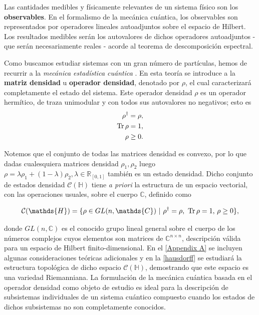 \documentclass{report} %
\numberwithin{equation}{section}
\begin{document}
Las cantidades medibles y físicamente relevantes de un sistema físico son los \textbf{observables}. En el formalismo de la mecánica cuántica, los observables son representados por operadores lineales autoadjuntos sobre el espacio de Hilbert. Los resultados medibles serán los autovalores de dichos operadores autoadjuntos - que serán necesariamente reales - acorde al teorema de descomposición espectral.

Como buscamos estudiar sistemas con un gran número de partículas, hemos de recurrir a la \textit{mecánica estadística cuántica} \cite{PATHRIA2011115,Nielsen.00,HeinzPetruccione}. 
En esta teoría se introduce a la \textbf{matriz densidad} u \textbf{operador densidad}, denotado por $\rho$, el cual caracterizará completamente el estado del sistema. Este {operador densidad} $\rho$ es un operador hermítico, de traza unimodular y con todos sus autovalores no negativos; esto es
\begin{subequations}
\begin{align}
    \rho^{\dagger} = \rho, \\
    \Tr \rho = 1, \\
    \rho \geq 0.
\end{align}
\end{subequations}

Notemos que el conjunto de todas las matrices densidad es convexo, por lo que dadas cualesquiera matrices densidad $\rho_1, \rho_2$ luego $\rho = \lambda\rho_1+ (1-\lambda)\rho_2, \lambda \in \mathds{R}_{[0,1]}$ también es un estado densidad. Dicho conjunto de estados densidad $\mathcal{C}(\mathds{H})$ tiene \textit{a priori} la estructura de un espacio vectorial, con las operaciones usuales, sobre el cuerpo $\mathds{C}$, definido como 

\begin{equation}
    \mathcal{C}(\mathds{H}) = \{\rho \in GL(n, \mathds{C}) \textnormal{ }| \textnormal{ }\rho^{\dagger} = \rho \textnormal{, } \Tr \rho = 1 \textnormal{, } \rho \geq 0\},
\end{equation}

donde $GL(n,\mathds{C})$ es el conocido grupo lineal general sobre el cuerpo de los números complejos cuyos elementos son matrices de $\mathds{C}^{n\times n}$, descripción válida para un espacio de Hilbert finito-dimensional. En el \autoref{Appendix A} se incluyen algunas consideraciones teóricas adicionales y en la \autoref{hausdorff} se estudiará la estructura topológica de dicho espacio $\mathcal{C}(\mathds{H})$, demostrando que este espacio es una variedad Riemanniana. La formulación de la mecánica cuántica basada en el operador densidad como objeto de estudio es ideal para la descripción de subsistemas individuales de un sistema cuántico compuesto \cite{Nielsen.00} cuando los estados de dichos subsistemas no son completamente conocidos. \\
\end{document}
